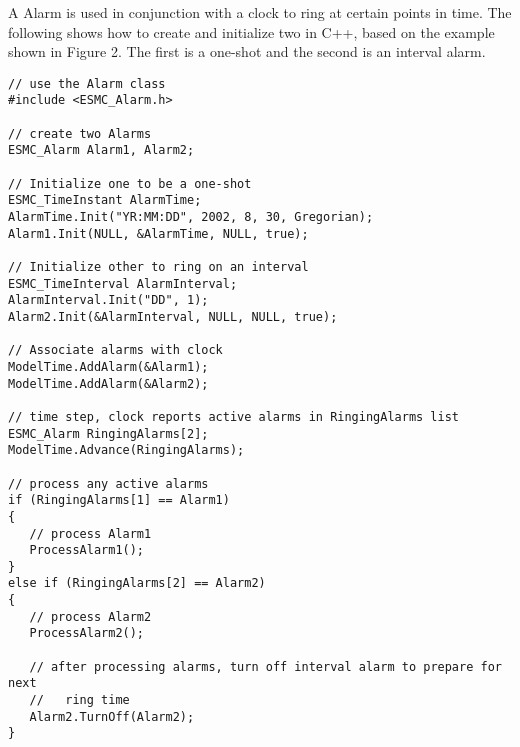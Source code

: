 
A Alarm is used in conjunction with a clock to ring at certain points in time.
The following shows how to create and initialize two in C++, based on the
example shown in Figure 2.  The first is a one-shot and the second is an
interval alarm.

\begin{verbatim}
// use the Alarm class
#include <ESMC_Alarm.h>

// create two Alarms
ESMC_Alarm Alarm1, Alarm2;

// Initialize one to be a one-shot
ESMC_TimeInstant AlarmTime;
AlarmTime.Init("YR:MM:DD", 2002, 8, 30, Gregorian);
Alarm1.Init(NULL, &AlarmTime, NULL, true);

// Initialize other to ring on an interval
ESMC_TimeInterval AlarmInterval;
AlarmInterval.Init("DD", 1);
Alarm2.Init(&AlarmInterval, NULL, NULL, true);

// Associate alarms with clock
ModelTime.AddAlarm(&Alarm1);
ModelTime.AddAlarm(&Alarm2);

// time step, clock reports active alarms in RingingAlarms list
ESMC_Alarm RingingAlarms[2];
ModelTime.Advance(RingingAlarms);

// process any active alarms
if (RingingAlarms[1] == Alarm1)
{
   // process Alarm1
   ProcessAlarm1();
}
else if (RingingAlarms[2] == Alarm2)
{
   // process Alarm2
   ProcessAlarm2();

   // after processing alarms, turn off interval alarm to prepare for next
   //   ring time
   Alarm2.TurnOff(Alarm2);
}
\end{verbatim}
